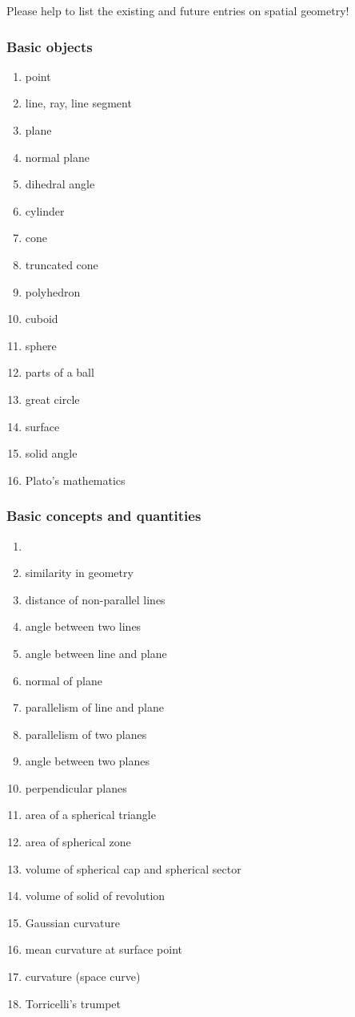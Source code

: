 \documentclass[12pt]{article}
\theoremstyle{definition}
\begin{document}
Please help to list the existing and future entries on spatial geometry!\\

\subsubsection*{Basic objects}
\begin{enumerate}
\item point 
\item line, ray, line segment
\item plane
\item normal plane
\item dihedral angle
\item cylinder
\item cone
\item truncated cone
\item polyhedron
\item cuboid
\item sphere
\item parts of a ball
\item great circle
\item surface
\item solid angle
\item Plato's mathematics
\end{enumerate}

\subsubsection*{Basic concepts and quantities}
\begin{enumerate}
\item {}
\item similarity in geometry
\item distance of non-parallel lines
\item angle between two lines
\item angle between line and plane
\item normal of plane
\item parallelism of line and plane
\item parallelism of two planes
\item angle between two planes
\item perpendicular planes
\item area of a spherical triangle
\item area of spherical zone
\item volume of spherical cap and spherical sector
\item volume of solid of revolution
\item Gaussian curvature
\item mean curvature at surface point
\item curvature (space curve)
\item Torricelli's trumpet
\end{enumerate}
\end{document}
